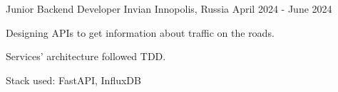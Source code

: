 

\begin{cventries}

  \cventry
    {Junior Backend Developer} %
    {Invian} %
    {Innopolis, Russia} %
    {April 2024 - June 2024} %
    {
      \begin{cvitems} %
        \item {Designing APIs to get information about traffic on the roads. }
        \item {Services' architecture followed TDD. }
        \item {Stack used: FastAPI, InfluxDB}
      \end{cvitems}
    }
\end{cventries}
